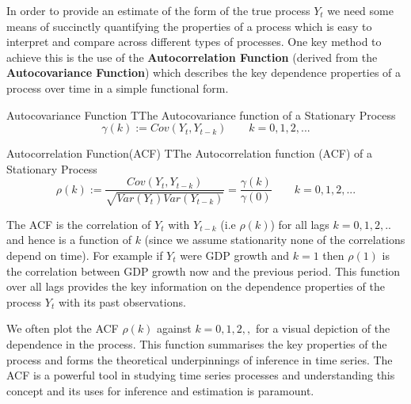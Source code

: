 \documentclass[openany]{tufte-book} %
\begin{document}
In order to provide an estimate  of the form of the true process $Y_t$ we need some means of succinctly quantifying the properties of a process which is easy to interpret and compare across different types of processes. One key method to achieve this is the use of the \textbf{Autocorrelation Function} (derived from the \textbf{Autocovariance Function}) which describes the key dependence properties of a process over time in a simple functional form.\\



\begin{mydef}{Autocovariance Function} TThe Autocovariance function of a Stationary Process
  \begin{equation*} \gamma(k):=Cov(Y_t,Y_{t-k}) \qquad k=0,1,2,...\end{equation*} \end{mydef}



\begin{mydef}{Autocorrelation Function(ACF)}  TThe Autocorrelation function (ACF) of a Stationary Process\\
\begin{equation*}\rho(k):=\frac{Cov(Y_t,Y_{t-k})}{\sqrt{Var(Y_t)Var(Y_{t-k})}}=\frac{\gamma(k)}{\gamma(0)} \qquad k=0,1,2,... \end{equation*}\end{mydef}


 The ACF is the correlation of $Y_t$ with $Y_{t-k}$  (i.e $\rho(k)$) for all lags  $k=0,1,2,..$ and hence is a function of $k$ (since we assume stationarity none of the correlations depend on time).   For example if $Y_t$ were GDP growth and $k=1$ then $\rho(1)$ is the correlation between GDP growth now and the previous period. This function over all lags provides the key information on the dependence properties of the process $Y_t$ with its past observations.

We often plot  the ACF $\rho(k)$   against $k=0,1,2,,$ for a visual depiction of the dependence in the process. This function summarises the key properties of the process and forms the theoretical underpinnings  of inference in time series. The ACF is a powerful tool in studying time series processes and understanding this concept and its uses for inference and estimation is paramount.
\end{document}
